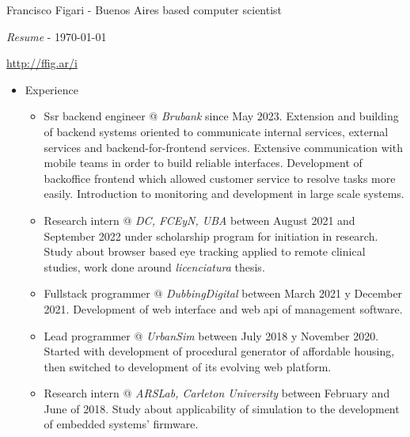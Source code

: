 \documentclass[a4paper]{article}
\begin{document}
\thispagestyle{empty}  %

Francisco Figari - Buenos Aires based computer scientist

\textit{Resume} - \monthyeardate\today

\url{http://ffig.ar/i}

\begin{itemize}

  \item Experience
  \begin{itemize}
    \item
      Ssr backend engineer @ \textit{Brubank} since May 2023. \newline
	  Extension and building of backend systems oriented to communicate
	  internal services, external services and backend-for-frontend
	  services. \newline
	  Extensive communication with mobile teams in order to build
	  reliable interfaces. \newline
	  Development of backoffice frontend which allowed customer service
	  to resolve tasks more easily. \newline
	  Introduction to monitoring and development in large scale systems.

    \item
      Research intern @ \textit{DC, FCEyN, UBA} between August 2021 and
      September 2022 under scholarship program for initiation in research.
      \newline
      Study about browser based eye tracking applied to remote clinical
      studies, work done around \textit{licenciatura} thesis.

    \item
      Fullstack programmer @ \textit{DubbingDigital} between March 2021 y
      December 2021.  \newline
      Development of web interface and web api of management software.

    \item
      Lead programmer @ \textit{UrbanSim} between July 2018 y November 2020.
      \newline
      Started with development of procedural generator of affordable housing,
      then switched to development of its evolving web platform.

    \item
      Research intern @ \textit{ARSLab, Carleton University} between February
      and June of 2018. \newline
      Study about applicability of simulation to the development of embedded
      systems' firmware.


\end{itemize}
\end{itemize}
\end{document}
